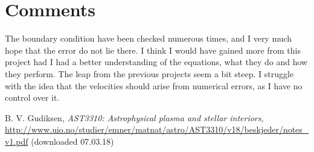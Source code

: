 \documentclass[a4paper,10pt]{article}
\begin{document}
\section{Comments}
The boundary condition have been checked numerous times, and I very much hope that the error do not lie there. I think I would have gained more from this project had I had a better understanding of the equations, what they do and how they perform. The leap from the previous projects seem a bit steep. I struggle with the idea that the velocities should arise from numerical errors, as I have no control over it.


\begin{thebibliography}{9}

  B. V. Gudiksen,
  \textit{AST3310: Astrophysical plasma and stellar interiors},
  \url{http://www.uio.no/studier/emner/matnat/astro/AST3310/v18/beskjeder/notes_v1.pdf} (downloaded 07.03.18)
\end{thebibliography}
\end{document}
